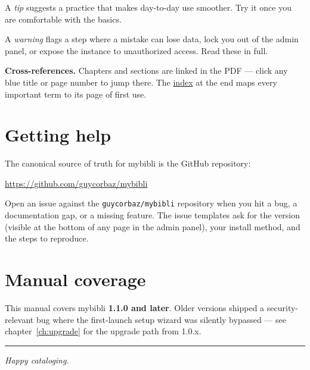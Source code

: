 \begin{tip}
A \emph{tip} suggests a practice that makes day-to-day use smoother.
Try it once you are comfortable with the basics.
\end{tip}

\begin{warning}
A \emph{warning} flags a step where a mistake can lose data, lock
you out of the admin panel, or expose the instance to unauthorized
access. Read these in full.
\end{warning}

\textbf{Cross-references.} Chapters and sections are linked in the
PDF — click any blue title or page number to jump there. The
\hyperref[index]{index} at the end maps every important term to its
page of first use.

\section*{Getting help}

The canonical source of truth for mybibli is the GitHub repository:

\begin{center}
\url{https://github.com/guycorbaz/mybibli}
\end{center}

Open an issue against the \texttt{guycorbaz/mybibli} repository when
you hit a bug, a documentation gap, or a missing feature. The issue
templates ask for the version (visible at the bottom of any page in
the admin panel), your install method, and the steps to reproduce.

\section*{Manual coverage}

This manual covers mybibli \textbf{1.1.0 and later}. Older versions
shipped a security-relevant bug where the first-launch setup wizard
was silently bypassed — see chapter~\ref{ch:upgrade} for the
upgrade path from 1.0.x.

\vspace{1cm}
\hrule
\vspace{0.5cm}
\textit{Happy cataloging.}

